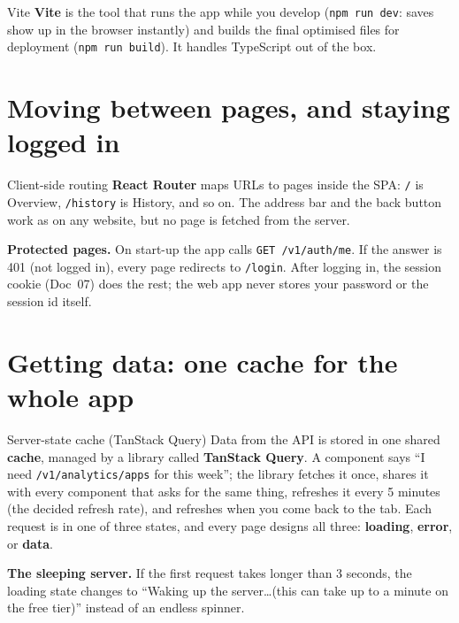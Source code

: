 \documentclass[11pt,a4paper]{article}
\begin{document}
\begin{concept}{Vite}
\textbf{Vite} is the tool that runs the app while you develop (\texttt{npm run dev}: saves show up
in the browser instantly) and builds the final optimised files for deployment
(\texttt{npm run build}). It handles TypeScript out of the box.
\end{concept}

\section{Moving between pages, and staying logged in}

\begin{concept}{Client-side routing}
\textbf{React Router} maps URLs to pages inside the SPA: \texttt{/} is Overview,
\texttt{/history} is History, and so on. The address bar and the back button work as on any
website, but no page is fetched from the server.
\end{concept}

\noindent \textbf{Protected pages.} On start-up the app calls \texttt{GET /v1/auth/me}. If the answer
is 401 (not logged in), every page redirects to \texttt{/login}. After logging in, the session
cookie (Doc~07) does the rest; the web app never stores your password or the session id itself.

\section{Getting data: one cache for the whole app}

\begin{concept}{Server-state cache (TanStack Query)}
Data from the API is stored in one shared \textbf{cache}, managed by a library called
\textbf{TanStack Query}. A component says ``I need \texttt{/v1/analytics/apps} for this week'';
the library fetches it once, shares it with every component that asks for the same thing,
refreshes it every 5 minutes (the decided refresh rate), and refreshes when you come back to the
tab. Each request is in one of three states, and every page designs all three:
\textbf{loading}, \textbf{error}, or \textbf{data}.
\end{concept}

\noindent \textbf{The sleeping server.} If the first request takes longer than 3 seconds, the
loading state changes to ``Waking up the server\ldots (this can take up to a minute on the free
tier)'' instead of an endless spinner.
\end{document}
